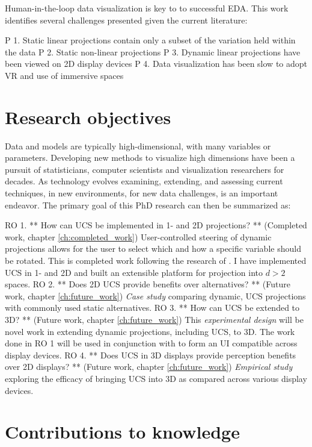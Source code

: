 \documentclass{monashthesis}
\begin{document}
Human-in-the-loop data visualization is key to to successful EDA. This
work identifies several challenges presented given the current
literature:

P 1. Static linear projections contain only a subset of the variation
held within the data P 2. Static non-linear projections P 3. Dynamic
linear projections have been viewed on 2D display devices P 4. Data
visualization has been slow to adopt VR and use of immersive spaces

\section{Research objectives}\label{research-objectives}

Data and models are typically high-dimensional, with many variables or
parameters. Developing new methods to visualize high dimensions have
been a pursuit of statisticians, computer scientists and visualization
researchers for decades. As technology evolves examining, extending, and
assessing current techniques, in new environments, for new data
challenges, is an important endeavor. The primary goal of this PhD
research can then be summarized as:

RO 1. ** How can UCS be implemented in 1- and 2D projections? **
(Completed work, chapter \ref{ch:completed_work}) User-controlled
steering of dynamic projections allows for the user to select which and
how a specific variable should be rotated. This is completed work
following the research of \textcite{cook_manual_1997}. I have
implemented UCS in 1- and 2D and built an extensible platform for
projection into \(d>2\) spaces. RO 2. ** Does 2D UCS provide benefits
over alternatives? ** (Future work, chapter \ref{ch:future_work})
\emph{Case study} comparing dynamic, UCS projections with commonly used
static alternatives. RO 3. ** How can UCS be extended to 3D? ** (Future
work, chapter \ref{ch:future_work}) This \emph{experimental design} will
be novel work in extending dynamic projections, including UCS, to 3D.
The work done in RO 1 will be used in conjunction with
\textcite{cordeil_immersive_2019} to form an UI compatible across
display devices. RO 4. ** Does UCS in 3D displays provide perception
benefits over 2D displays? ** (Future work, chapter
\ref{ch:future_work}) \emph{Empirical study} exploring the efficacy of
bringing UCS into 3D as compared across various display devices.

\section{Contributions to knowledge}\label{contributions-to-knowledge}
\end{document}
